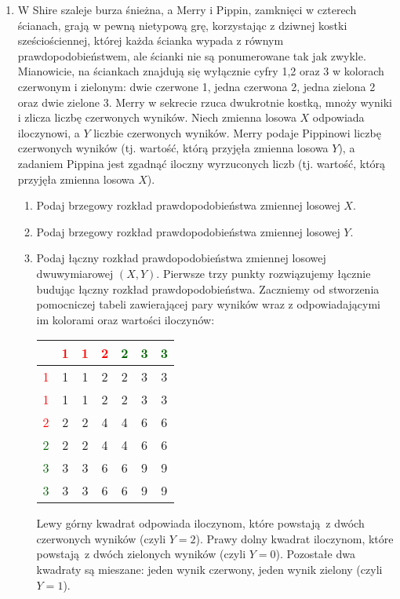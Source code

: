 \documentclass[twoside]{mwart}
\newenvironment{ansenv}{\comment}{\endcomment}
\newenvironment{ansenv}{\paragraph{Odpowiedź:}}{}
\begin{document}
\begin{enumerate}
\item W Shire szaleje burza śnieżna, a Merry i Pippin, zamknięci w czterech ścianach, grają w pewną nietypową grę, korzystając z dziwnej kostki sześciościennej, której każda ścianka wypada z równym prawdopodobieństwem, ale ścianki nie są ponumerowane tak jak zwykle.
Mianowicie, na ściankach znajdują się wyłącznie cyfry 1,2 oraz 3 w kolorach czerwonym i zielonym: dwie czerwone 1, jedna czerwona 2, jedna zielona 2 oraz dwie zielone 3.
Merry w sekrecie rzuca dwukrotnie kostką, mnoży wyniki i zlicza liczbę czerwonych wyników.
Niech zmienna losowa $X$ odpowiada iloczynowi, a $Y$ liczbie czerwonych wyników.
Merry podaje Pippinowi liczbę czerwonych wyników (tj. wartość, którą przyjęła zmienna losowa $Y$), a zadaniem Pippina jest zgadnąć iloczny wyrzuconych liczb (tj. wartość, którą przyjęła zmienna losowa $X$).

\begin{enumerate}
	\item Podaj brzegowy rozkład prawdopodobieństwa zmiennej losowej $X$. 
	\item Podaj brzegowy rozkład prawdopodobieństwa zmiennej losowej $Y$. 
	\item Podaj łączny rozkład prawdopodobieństwa zmiennej losowej dwuwymiarowej $(X,Y)$. 
	\begin{ansenv}
		Pierwsze trzy punkty rozwiązujemy łącznie budując łączny rozkład prawdopodobieństwa. Zaczniemy od stworzenia pomocniczej tabeli zawierającej pary wyników wraz z odpowiadającymi im kolorami oraz wartości iloczynów:
		
		\begin{tabular}{c|ccc|ccc}
			\diagbox{kostka 1}{kostka 2} & \textcolor{red}{1} & \textcolor{red}{1} & \textcolor{red}{2} & \textcolor{darkgreen}{2} & \textcolor{darkgreen}{3} & \textcolor{darkgreen}{3} \\
			\hline
			\textcolor{red}{1} & 1 & 1 & 2 & 2 & 3 & 3 \\
			\textcolor{red}{1} & 1 & 1 & 2 & 2 & 3 & 3 \\
			\textcolor{red}{2} & 2 & 2 & 4 & 4 & 6 & 6 \\
			\hline
			\textcolor{darkgreen}{2} & 2 & 2 & 4 & 4 & 6 & 6 \\
			\textcolor{darkgreen}{3} & 3 & 3 & 6 & 6 & 9 & 9 \\
			\textcolor{darkgreen}{3} & 3 & 3 & 6 & 6 & 9 & 9 \\
		\end{tabular}
	
		Lewy górny kwadrat odpowiada iloczynom, które powstają z dwóch czerwonych wyników (czyli $Y=2$). Prawy dolny kwadrat iloczynom, które powstają z dwóch zielonych wyników (czyli $Y=0$).
		Pozostałe dwa kwadraty są mieszane: jeden wynik czerwony, jeden wynik zielony (czyli $Y=1$).
		

\end{ansenv}
\end{enumerate}
\end{enumerate}
\end{document}
